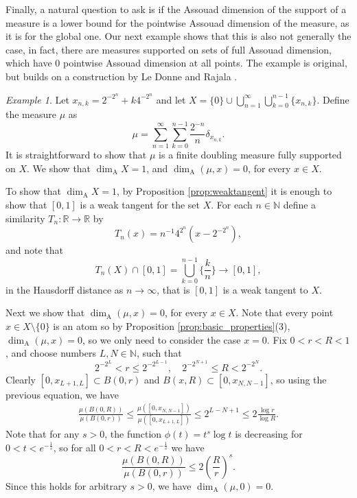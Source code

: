 \documentclass{PRM}
\newcommand{\field}[1]{\mathbb{#1}}
\newcommand{\N}{\field{N}}
\newcommand{\R}{\field{R}}
\theoremstyle{plain}
\theoremstyle{definition}
\theoremstyle{remark}
\newtheorem{example}[thm]{Example}
\begin{document}
Finally, a natural question to ask is if the Assouad dimension of the support of a measure is a lower bound for the pointwise Assouad dimension of the measure, as it is for the global one. Our next example shows that this is also not generally the case, in fact, there are measures supported on sets of full Assouad dimension, which have $0$ pointwise Assouad dimension at all points. The example is original, but builds on a construction by Le Donne and Rajala \cite[Example 2.20]{LR}.

\begin{example}
Let $x_{n,k}=2^{-2^n}+k4^{-2^n}$ and let $X=\{0\}\cup\bigcup_{n=1}^{\infty}\bigcup_{k=0}^{n-1}\{x_{n,k}\}$. Define the measure $\mu$ as 
\begin{equation*}
    \mu=\sum_{n=1}^{\infty}\sum_{k=0}^{n-1}\frac{2^{-n}}{n}\delta_{x_{n,k}}.
\end{equation*}
It is straightforward to show that $\mu$ is a finite doubling measure fully supported on $X$. We show that $\dim_{\mathrm{A}}X=1$, and $\dim_{\mathrm{A}}(\mu,x)=0$, for every $x\in X$.

To show that $\dim_{\mathrm{A}}X= 1$, by Proposition \ref{prop:weaktangent} it is enough to show that $[0,1]$ is a weak tangent for the set $X$. For each $n\in\N$ define a similarity $T_n:\R\to \R$ by
\begin{equation*}
    T_n(x)=n^{-1}4^{2^n}(x-2^{-2^n}),
\end{equation*}
and note that
\begin{equation*}
    T_n(X)\cap[0,1]=\bigcup_{k=0}^{n-1}\Big\{\frac{k}{n}\Big\}\to[0,1],
\end{equation*}
in the Hausdorff distance as $n\to\infty$, that is $[0,1]$ is a weak tangent to $X$.

Next we show that $\dim_{\mathrm{A}}(\mu,x)=0$, for every $x\in X$. Note that every point $x\in X\setminus\{0\}$ is an atom so by Proposition \ref{prop:basic_properties}(3), $\dim_{\mathrm{A}}(\mu,x)=0$, so we only need to consider the case $x=0$. Fix $0<r<R<1$, and choose numbers $L,N\in\N$, such that
\begin{equation*}
    2^{-2^L}< r \leq 2^{-2^{L-1}}, \quad2^{-2^{N+1}}\leq R < 2^{-2^{N}}.
\end{equation*}
Clearly $[0,x_{L+1,L}]\subset B(0,r)$ and $B(x,R)\subset [0,x_{N,N-1}]$, so using the previous equation, we have
\begin{align*}
    \frac{\mu(B(0,R))}{\mu(B(0,r))}\leq\frac{\mu([0,x_{N,N-1}])}{\mu([0,x_{L+1,L}])}\leq 2^{L-N+1}\leq 2\frac{\log r}{\log R}.
\end{align*}
Note that for any $s>0$, the function $\phi(t)=t^s\log t$ is decreasing for  $0<t<e^{-\frac{1}{s}}$, so for all $0<r<R<e^{-\frac{1}{s}}$ we have
\begin{equation*}
    \frac{\mu(B(0,R))}{\mu(B(0,r))}\leq 2\left(\frac{R}{r}\right)^s.
\end{equation*}
Since this holds for arbitrary $s>0$, we have $\dim_{\mathrm{A}}(\mu,0)=0$.
\end{example}
\end{document}
